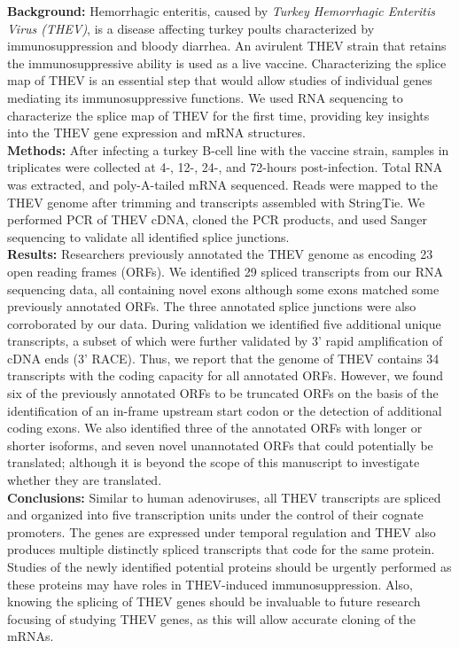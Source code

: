 \documentclass[
]{article}
\begin{document}
\textbf{Background:} Hemorrhagic enteritis, caused by \emph{Turkey
Hemorrhagic Enteritis Virus (THEV)}, is a disease affecting turkey
poults characterized by immunosuppression and bloody diarrhea. An
avirulent THEV strain that retains the immunosuppressive ability is used
as a live vaccine. Characterizing the splice map of THEV is an essential
step that would allow studies of individual genes mediating its
immunosuppressive functions. We used RNA sequencing to characterize the
splice map of THEV for the first time, providing key insights into the
THEV gene expression and mRNA structures.\\
\textbf{Methods:} After infecting a turkey B-cell line with the vaccine
strain, samples in triplicates were collected at 4-, 12-, 24-, and
72-hours post-infection. Total RNA was extracted, and poly-A-tailed mRNA
sequenced. Reads were mapped to the THEV genome after trimming and
transcripts assembled with StringTie. We performed PCR of THEV cDNA,
cloned the PCR products, and used Sanger sequencing to validate all
identified splice junctions.\\
\textbf{Results:} Researchers previously annotated the THEV genome as
encoding 23 open reading frames (ORFs). We identified 29 spliced
transcripts from our RNA sequencing data, all containing novel exons
although some exons matched some previously annotated ORFs. The three
annotated splice junctions were also corroborated by our data. During
validation we identified five additional unique transcripts, a subset of
which were further validated by 3' rapid amplification of cDNA ends (3'
RACE). Thus, we report that the genome of THEV contains 34 transcripts
with the coding capacity for all annotated ORFs. However, we found six
of the previously annotated ORFs to be truncated ORFs on the basis of
the identification of an in-frame upstream start codon or the detection
of additional coding exons. We also identified three of the annotated
ORFs with longer or shorter isoforms, and seven novel unannotated ORFs
that could potentially be translated; although it is beyond the scope of
this manuscript to investigate whether they are translated.\\
\textbf{Conclusions:} Similar to human adenoviruses, all THEV
transcripts are spliced and organized into five transcription units
under the control of their cognate promoters. The genes are expressed
under temporal regulation and THEV also produces multiple distinctly
spliced transcripts that code for the same protein. Studies of the newly
identified potential proteins should be urgently performed as these
proteins may have roles in THEV-induced immunosuppression. Also, knowing
the splicing of THEV genes should be invaluable to future research
focusing of studying THEV genes, as this will allow accurate cloning of
the mRNAs.
\end{document}
